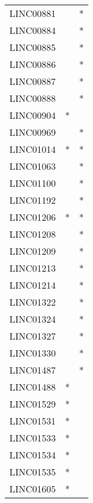 \begin{longtable}{lcc}
LINC00881        &                &          * \\
LINC00884        &                &          * \\
LINC00885        &                &          * \\
LINC00886        &                &          * \\
LINC00887        &                &          * \\
LINC00888        &                &          * \\
LINC00904        &              * &            \\
LINC00969        &                &          * \\
LINC01014        &              * &          * \\
LINC01063        &                &          * \\
LINC01100        &                &          * \\
LINC01192        &                &          * \\
LINC01206        &              * &          * \\
LINC01208        &                &          * \\
LINC01209        &                &          * \\
LINC01213        &                &          * \\
LINC01214        &                &          * \\
LINC01322        &                &          * \\
LINC01324        &                &          * \\
LINC01327        &                &          * \\
LINC01330        &                &          * \\
LINC01487        &                &          * \\
LINC01488        &              * &            \\
LINC01529        &              * &            \\
LINC01531        &              * &            \\
LINC01533        &              * &            \\
LINC01534        &              * &            \\
LINC01535        &              * &            \\
LINC01605        &              * &            \\

\end{longtable}
